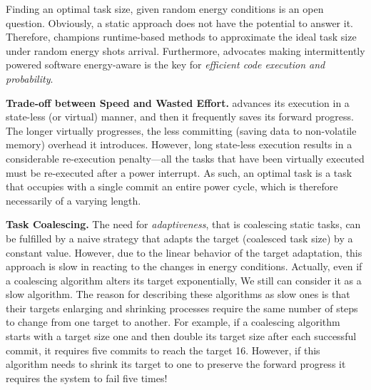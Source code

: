 
Finding an optimal task size, given random energy conditions is an open question. Obviously, a static approach does not have the potential to answer it. Therefore, \sys champions runtime-based methods to approximate the ideal task size under random energy shots arrival. Furthermore, \sys advocates making intermittently powered software energy-aware is the key for \emph{efficient code execution and probability}. 

\textbf{Trade-off between Speed and Wasted Effort.} \sys advances its execution in a state-less (or virtual) manner, and then it frequently saves its forward progress. The longer \sys virtually progresses, the less committing (saving data to non-volatile memory) overhead it introduces. However, long state-less execution results in a considerable re-execution penalty---all the tasks that have been virtually executed must be re-executed after a power interrupt. As such, an optimal task is a task that occupies with a single commit an entire power cycle, which is therefore necessarily of a varying length.  


\textbf{Task Coalescing.} 
The need for \emph{adaptiveness}, that is coalescing static tasks, can be fulfilled by a naive strategy that adapts the target (coalesced task size) by a constant value. However, due to the linear behavior of the target adaptation, this approach is slow in reacting to the changes in energy conditions. Actually, even if a coalescing algorithm alters its target exponentially, We still can consider it as a slow algorithm. The reason for describing these algorithms as slow ones is that their targets enlarging and shrinking processes require the same number of steps to change from one target to another. For example, if a coalescing algorithm starts with a target size one and then double its target size after each successful commit, it requires five commits to reach the target 16. However, if this algorithm needs to shrink its target to one to preserve the forward progress it requires the system to fail five times!

